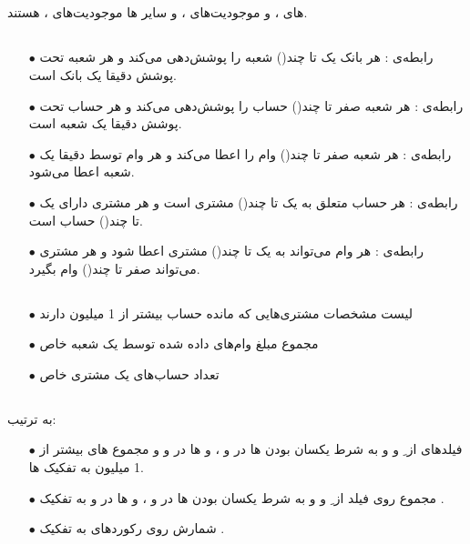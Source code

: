 \documentclass{article}
\begin{document}
\subsection{}
های ،  و  موجودیت‌های ، و سایر ها موجودیت‌های ، هستند.
\subsection{}
\begin{itemize}
    \item [$\bullet$] رابطه‌ی :
هر بانک یک تا چند() شعبه را پوشش‌دهی می‌کند و هر شعبه تحت پوشش دقیقا یک بانک است.
    \item [$\bullet$] رابطه‌ی :
هر شعبه صفر تا چند() حساب را پوشش‌دهی می‌کند و هر حساب تحت پوشش دقیقا یک شعبه است.
    \item [$\bullet$] رابطه‌ی :
هر شعبه صفر تا چند() وام را اعطا می‌کند و هر وام توسط دقیقا یک شعبه اعطا می‌شود.
    \item [$\bullet$] رابطه‌ی :
هر حساب متعلق به یک تا چند() مشتری است و هر مشتری دارای یک تا چند() حساب است.
    \item [$\bullet$] رابطه‌ی :
هر وام می‌تواند به یک تا چند() مشتری اعطا شود و هر مشتری می‌تواند صفر تا چند() وام بگیرد.

\end{itemize}
\subsection{}
\begin{itemize}
    \item [$\bullet$] لیست مشخصات مشتری‌هایی که مانده حساب بیشتر از 1 میلیون دارند
    \item [$\bullet$] مجموع مبلغ وام‌های داده شده توسط یک شعبه خاص
    \item [$\bullet$] تعداد حساب‌های یک مشتری خاص
\end{itemize}
\subsection{}
به ترتیب:
\begin{itemize}
    \item [$\bullet$] فیلدهای  از ِ  و  و  به شرط یکسان بودن ها در  و ، و ها در  و  و مجموع های بیشتر از 1 میلیون به تفکیک ها.
    \item [$\bullet$] مجموع روی فیلد  از ِ  و  و  به شرط یکسان بودن ها در  و ، و ها در  و  به تفکیک .
    \item [$\bullet$] شمارش روی رکوردهای  به تفکیک .
\end{itemize}
\end{document}
